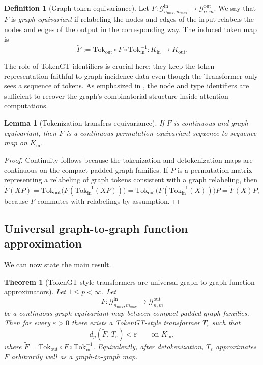 \documentclass[11pt]{article}
\theoremstyle{definition}
\newtheorem{definition}{Definition}[section]
\theoremstyle{plain}
\newtheorem{theorem}{Theorem}[section]
\newtheorem{lemma}{Lemma}[section]
\theoremstyle{remark}
\newcommand{\mc}[1]{\mathcal{#1}}
\begin{document}
\begin{definition}[Graph-token equivariance]
Let $F:\mc{G}_{n_{\max},m_{\max}}^{\mathrm{in}}\to \mc{G}_{\bar n,\bar m}^{\mathrm{out}}$.
We say that $F$ is \emph{graph-equivariant} if relabeling the nodes and edges of the input relabels the nodes and edges of the output in the corresponding way.
The induced token map is
\[
\widetilde F
:=
\mathrm{Tok}_{\mathrm{out}}\circ F\circ \mathrm{Tok}_{\mathrm{in}}^{-1}
:
K_{\mathrm{in}}\to K_{\mathrm{out}}.
\]
\end{definition}

The role of TokenGT identifiers is crucial here:
they keep the token representation faithful to graph incidence data even though the Transformer only sees a sequence of tokens.
As emphasized in \cite{KimNguyenMinChoLeeLeeHong2022}, the node and type identifiers are sufficient to recover the graph's combinatorial structure inside attention computations.

\begin{lemma}[Tokenization transfers equivariance]
\label{lem:tokenization-equivariance}
If $F$ is continuous and graph-equivariant, then $\widetilde F$ is a continuous permutation-equivariant sequence-to-sequence map on $K_{\mathrm{in}}$.
\end{lemma}

\begin{proof}
Continuity follows because the tokenization and detokenization maps are continuous on the compact padded graph families.
If $P$ is a permutation matrix representing a relabeling of graph tokens consistent with a graph relabeling, then
\[
\widetilde F(XP)
=
\mathrm{Tok}_{\mathrm{out}}\!\bigl(F(\mathrm{Tok}_{\mathrm{in}}^{-1}(XP))\bigr)
=
\mathrm{Tok}_{\mathrm{out}}\!\bigl(F(\mathrm{Tok}_{\mathrm{in}}^{-1}(X))\bigr)P
=
\widetilde F(X)P,
\]
because $F$ commutes with relabelings by assumption.
\end{proof}

\subsection{Universal graph-to-graph function approximation}
\label{sec:graph-to-graph-uap}

We can now state the main result.

\begin{theorem}[TokenGT-style transformers are universal graph-to-graph function approximators]
\label{thm:tokengt-graph-uap}
Let $1\le p<\infty$.
Let
\[
F:\mc{G}_{n_{\max},m_{\max}}^{\mathrm{in}} \to \mc{G}_{\bar n,\bar m}^{\mathrm{out}}
\]
be a continuous graph-equivariant map between compact padded graph families.
Then for every $\varepsilon>0$ there exists a TokenGT-style transformer $T_\varepsilon$ such that
\[
d_p\!\left(
\widetilde F,\,
T_\varepsilon
\right)
< \varepsilon
\qquad\text{on }K_{\mathrm{in}},
\]
where $\widetilde F=\mathrm{Tok}_{\mathrm{out}}\circ F\circ \mathrm{Tok}_{\mathrm{in}}^{-1}$.
Equivalently, after detokenization, $T_\varepsilon$ approximates $F$ arbitrarily well as a graph-to-graph map.
\end{theorem}
\end{document}
